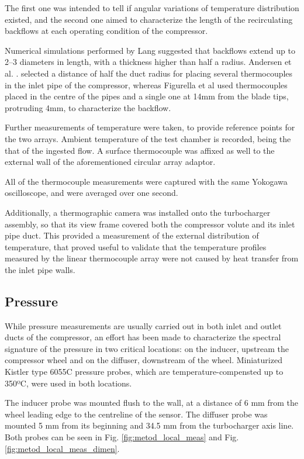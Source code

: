 The first one was intended to tell if angular variations of temperature distribution existed, and the second one aimed to characterize the length of the recirculating backflows at each operating condition of the compressor.

Numerical simulations performed by Lang \cite{lang2011contribucion} suggested that backflows extend up to 2--3 diameters in length, with a thickness higher than half a radius. Andersen et al. \cite{andersen2009surge}. selected a distance of half the duct radius for placing several thermocouples in the inlet pipe of the compressor, whereas Figurella et al \cite{figurella2012noise} used thermocouples placed in the centre of the pipes and a single one at 14mm from the blade tips, protruding 4mm, to characterize the backflow.

Further measurements of temperature were taken, to provide reference points for the two arrays. Ambient temperature of the test chamber is recorded, being the that of the ingested flow. A surface thermocouple was affixed as well to the external wall of the aforementioned circular array adaptor.

All of the thermocouple measurements were captured with the same Yokogawa oscilloscope, and were averaged over one second.

Additionally, a thermographic camera was installed onto the turbocharger assembly, so that its view frame covered both the compressor volute and its inlet pipe duct. This provided a measurement of the external distribution of temperature, that proved useful to validate that the temperature profiles measured by the linear thermocouple array were not caused by heat transfer from the inlet pipe walls.

\subsection{Pressure}

While pressure measurements are usually carried out in both inlet and outlet ducts of the compressor, an effort has been made to characterize the spectral signature of the pressure in two critical locations: on the inducer, upstream the compressor wheel and on the diffuser, downstream of the wheel. Miniaturized Kistler type 6055C pressure probes, which are temperature-compensted up to 350ºC, were used in both locations. 

The inducer probe was mounted flush to the wall, at a distance of 6 mm from the wheel leading edge to the centreline of the sensor. The diffuser probe was mounted 5 mm from its beginning and 34.5 mm from the turbocharger axis line. Both probes can be seen in Fig. \ref{fig:metod_local_meas} and Fig. \ref{fig:metod_local_meas_dimen}.

